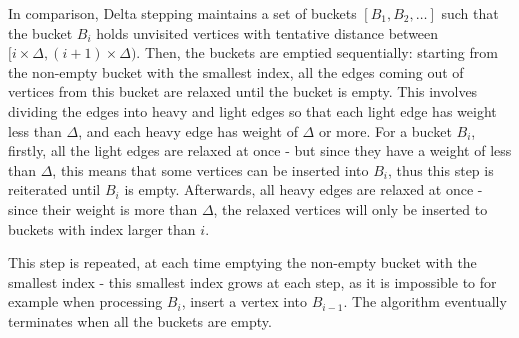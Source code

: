 \documentclass[12pt]{article}
\begin{document}
In comparison, Delta stepping maintains a set of buckets   $[B_1, B_2, …]$ such that the bucket $B_i$ holds unvisited vertices with tentative distance between $[i \times \Delta, (i + 1) \times \Delta)$. Then, the buckets are emptied sequentially: starting from the non-empty bucket with the smallest index, all the edges coming out of vertices from this bucket are relaxed until the bucket is empty. This involves dividing the edges into heavy and light edges so that each light edge has weight less than $\Delta$, and each heavy edge has weight of $\Delta$ or more. For a bucket $B_i$, firstly, all the light edges are relaxed at once - but since they have a weight of less than $\Delta$, this means that some vertices can be inserted into $B_i$,  thus this step is reiterated until $B_i$ is empty. Afterwards, all heavy edges are relaxed at once - since their weight is more than $\Delta$, the relaxed vertices will only be inserted to buckets with index larger than $i$.

This  step is repeated, at each time emptying the non-empty bucket with the smallest index - this smallest index grows at each step, as it is impossible to for example when processing $B_i$, insert a vertex into $B_{i-1}$. The algorithm eventually terminates when all the buckets are empty.
\end{document}

